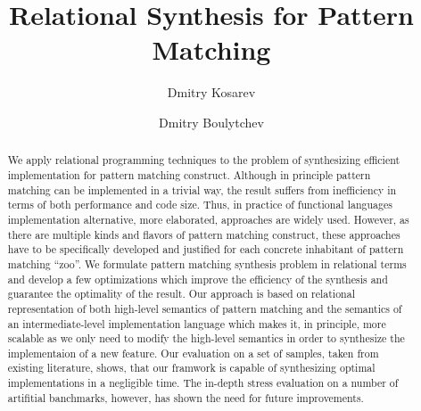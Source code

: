 \documentclass[acmlarge]{acmart}
\begin{document}
\title[Relational Synthesis of Pattern Matching]{Relational Synthesis for Pattern Matching}    



\author{Dmitry Kosarev}

\author{Dmitry Boulytchev}




\begin{abstract}
  We apply relational programming techniques to the problem of synthesizing efficient implementation for pattern matching construct. Although in principle
  pattern matching can be implemented in a trivial way, the result suffers from inefficiency in terms of both performance and code size. Thus, in practice of
  functional languages implementation alternative, more elaborated, approaches are widely used. However, as there are multiple kinds and flavors of pattern
  matching construct, these approaches have to be specifically developed and justified for each concrete inhabitant of pattern matching ``zoo''. We formulate
  pattern matching synthesis problem in relational terms and develop a few optimizations which improve the efficiency of the synthesis and guarantee the
  optimality of the result. Our approach is based on relational representation of both high-level semantics of pattern matching and the semantics of
  an intermediate-level implementation language which makes it, in principle, more scalable as we only need to modify the high-level semantics in order
  to synthesize the implementaion of a new feature. Our evaluation on a set of samples, taken from existing literature, shows, that our framwork is
  capable of synthesizing optimal implementations in a negligible time. The in-depth stress evaluation on a number of artifitial banchmarks, however,
  has shown the need for future improvements.
\end{abstract}
\end{document}
